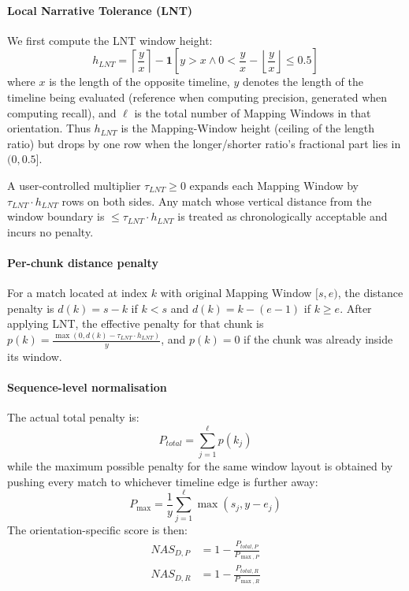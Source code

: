 \documentclass[main.tex]{subfiles}
\begin{document}
\paragraph{Local Narrative Tolerance (LNT)}
We first compute the LNT window height:
\begin{equation}
h_{LNT} = \left\lceil \frac{y}{x} \right\rceil - \mathbf{1}[y > x \land 0 < \frac{y}{x} - \left\lfloor \frac{y}{x} \right\rfloor \leq 0.5]
\end{equation}
where $x$ is the length of the opposite timeline, $y$ denotes the length of the timeline being evaluated (reference when computing precision, generated when computing recall), and $\ell$ is the total number of Mapping Windows in that orientation. Thus $h_{LNT}$ is the Mapping-Window height (ceiling of the length ratio) but drops by one row when the longer/shorter ratio's fractional part lies in $(0, 0.5]$.

A user-controlled multiplier $\tau_{LNT} \geq 0$ expands each Mapping Window by $\tau_{LNT} \cdot h_{LNT}$ rows on both sides. Any match whose vertical distance from the window boundary is $\leq \tau_{LNT} \cdot h_{LNT}$ is treated as chronologically acceptable and incurs no penalty.

\paragraph{Per-chunk distance penalty}
For a match located at index $k$ with original Mapping Window $[s, e)$, the distance penalty is $d(k) = s - k$ if $k < s$ and $d(k) = k - (e - 1)$ if $k \geq e$. After applying LNT, the effective penalty for that chunk is $p(k) = \frac{\max(0, d(k) - \tau_{LNT} \cdot h_{LNT})}{y}$,
and $p(k) = 0$ if the chunk was already inside its window.

\paragraph{Sequence-level normalisation}
The actual total penalty is:
\begin{equation}
P_{total} = \sum_{j=1}^{\ell} p(k_j)
\end{equation}
while the maximum possible penalty for the same window layout is obtained by pushing every match to whichever timeline edge is further away:
\begin{equation}
P_{\max} = \frac{1}{y} \sum_{j=1}^{\ell} \max(s_j, y - e_j)
\end{equation}
The orientation-specific score is then:
\begin{align}
NAS_{D,P} &= 1 - \frac{P_{total,P}}{P_{\max,P}} \\
NAS_{D,R} &= 1 - \frac{P_{total,R}}{P_{\max,R}}
\end{align}
\end{document}
